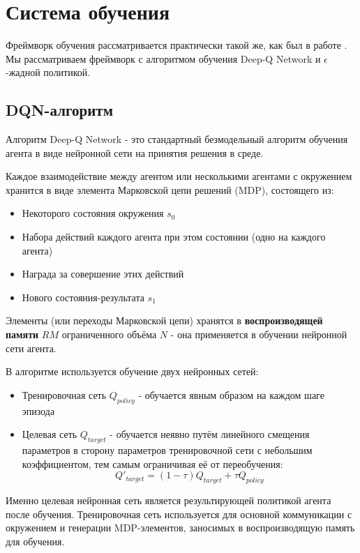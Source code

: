 \section{Система обучения}

Фреймворк обучения рассматривается практически такой же, как был в работе \cite{planes}.
Мы рассматриваем фреймворк с алгоритмом обучения Deep-Q Network и $\epsilon$-жадной политикой.

\subsection{DQN-алгоритм}

Алгоритм Deep-Q Network - это стандартный безмодельный алгоритм обучения агента в виде 
нейронной сети на принятия решения в среде.

Каждое взаимодействие между агентом или 
несколькими агентами с окружением хранится в виде элемента Марковской цепи решений (MDP), состоящего из:

\begin{itemize}
\item Некоторого состояния окружения \textbf{$s_0$}
\item Набора действий каждого агента при этом состоянии (одно на каждого агента)
\item Награда за совершение этих действий
\item Нового состояния-результата \textbf{$s_1$}
\end{itemize}

Элементы (или переходы Марковской цепи) хранятся в \textbf{воспроизводящей памяти} $RM$
ограниченного объёма $N$ - она применяется в обучении нейронной сети агента.

В алгоритме используется обучение двух нейронных сетей:
\begin{itemize}
\item Тренировочная сеть $Q_{policy}$ - обучается явным образом на каждом шаге эпизода
\item Целевая сеть $Q_{target}$ - обучается неявно путём линейного смещения параметров в 
    сторону параметров 
	тренировочной сети с небольшим коэффициентом, тем самым ограничивая её от переобучения:
	\begin{equation}
	\label{eq:tar_pol}
	Q'_{target} = (1-\tau)Q_{target} + \tau Q_{policy}
	\end{equation}
\end{itemize}

Именно целевая нейронная сеть является результирующей политикой агента после обучения.
Тренировочная сеть используется для основной коммуникации с окружением и генерации MDP-элементов,
заносимых в воспроизводящую память для обучения.

